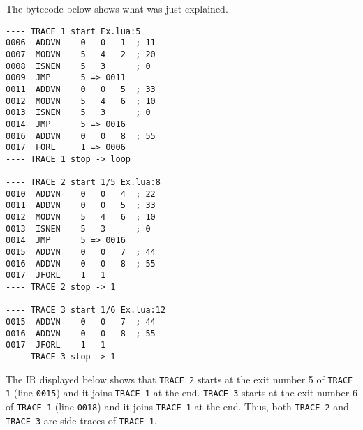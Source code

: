 The bytecode below shows what was just explained.
\begin{multicols}{2}
\begin{lstlisting}[style=DumpStyle]
---- TRACE 1 start Ex.lua:5
0006  ADDVN    0   0   1  ; 11
0007  MODVN    5   4   2  ; 20
0008  ISNEN    5   3      ; 0
0009  JMP      5 => 0011
0011  ADDVN    0   0   5  ; 33
0012  MODVN    5   4   6  ; 10
0013  ISNEN    5   3      ; 0
0014  JMP      5 => 0016
0016  ADDVN    0   0   8  ; 55
0017  FORL     1 => 0006
---- TRACE 1 stop -> loop

---- TRACE 2 start 1/5 Ex.lua:8
0010  ADDVN    0   0   4  ; 22
0011  ADDVN    0   0   5  ; 33
0012  MODVN    5   4   6  ; 10
0013  ISNEN    5   3      ; 0
0014  JMP      5 => 0016
0015  ADDVN    0   0   7  ; 44
0016  ADDVN    0   0   8  ; 55
0017  JFORL    1   1
---- TRACE 2 stop -> 1

---- TRACE 3 start 1/6 Ex.lua:12
0015  ADDVN    0   0   7  ; 44
0016  ADDVN    0   0   8  ; 55
0017  JFORL    1   1
---- TRACE 3 stop -> 1
\end{lstlisting}
\end{multicols}

\noindent
The IR displayed below shows that \texttt{TRACE 2} starts at the exit number 5 of \texttt{TRACE 1} (line \texttt{0015}) and it joins \texttt{TRACE 1} at the end. \texttt{TRACE 3} starts at the exit number 6 of \texttt{TRACE 1} (line \texttt{0018}) and it joins \texttt{TRACE 1} at the end. Thus, both \texttt{TRACE 2} and \texttt{TRACE 3} are side traces of  \texttt{TRACE 1}.

